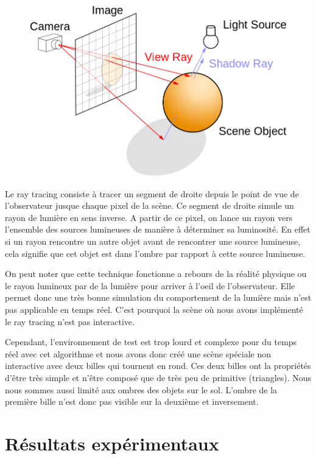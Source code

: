 \documentclass[a4paper,10pt]{report}
\begin{document}
\begin{figure}[H]
\includegraphics[scale=0.5]{images/ray_tracing.png}
\centering
{}
\end{figure}

Le ray tracing consiste à tracer un segment de droite depuis le point de vue de l'observateur jusque chaque pixel de la scène. Ce segment de droite simule un rayon de lumière en sens inverse. A partir de ce pixel, on lance un rayon vers l'ensemble des sources lumineuses de manière à déterminer sa luminosité. En effet si un rayon rencontre un autre objet avant de rencontrer une source lumineuse, cela signifie que cet objet est dans l'ombre par rapport à cette source lumineuse.

On peut noter que cette technique fonctionne a rebours de la réalité physique ou le rayon lumineux par de la lumière pour arriver à l'oeil de l'observateur. Elle permet donc une très bonne simulation du comportement de la lumière mais n'est pas applicable en temps réel. C'est pourquoi la scène où nous avons implémenté le ray tracing n'est pas interactive.

Cependant, l'environnement de test est trop lourd et complexe pour du temps réel avec cet algorithme et nous avons donc créé une scène spéciale non interactive avec deux billes qui tournent en rond. Ces deux billes ont la propriétés d'\^etre très simple et n'\^etre composé que de très peu de primitive (triangles).
Nous nous sommes aussi limité aux ombres des objets sur le sol. L'ombre de la première bille n'est donc pas visible sur la deuxième et inversement.


\chapter{Résultats expérimentaux}
\end{document}
